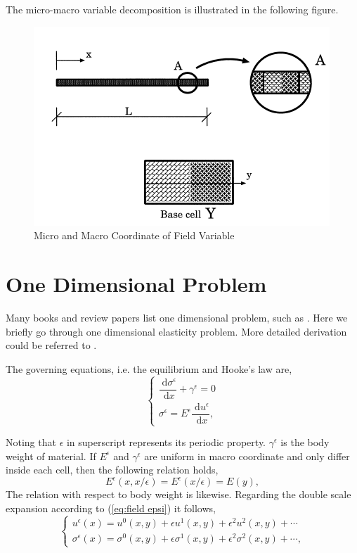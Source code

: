 \documentclass[10pt,a4paper]{scrreprt}
\newcommand{\myd}{\;\mathrm{d}}
\begin{document}
The micro-macro variable decomposition is illustrated in the following figure.

\begin{figure}[h]
  \centering
    \label{fig: scale sepa}
    \includegraphics[width=0.45\linewidth]{../pics/ref_cell_mic_mac_coord.png}
  \caption{Micro and Macro Coordinate of Field Variable \citep{hassani1998review}}
\end{figure}

\section{One Dimensional Problem}
Many books and review papers list one dimensional problem, such as \citep{cioranescu_introduction_2000}. Here we briefly go through one dimensional elasticity problem. More detailed derivation could be referred to \citep{hassani1998review}.

The governing equations, i.e. the equilibrium and Hooke's law are,
\begin{equation}
\left\{
\begin{array}{l}
\dfrac{\myd{\sigma^{\epsilon}}}{\myd{x}} + \gamma^{\epsilon} = 0 \\
\sigma^{\epsilon} = E^{\epsilon} \dfrac{\myd{u^{\epsilon}}}{\myd{x}},
\end{array}
\right.
\end{equation}

Noting that $\epsilon$ in superscript represents its periodic property. $\gamma^{\epsilon}$ is the body weight of material. If $E^{\epsilon}$ and $\gamma^{\epsilon}$ are uniform in macro coordinate and only differ inside each cell, then the following relation holds,
\begin{equation}
E^{\epsilon}(x,x/\epsilon)=E^{\epsilon}(x/\epsilon)=E(y),
\end{equation}
The relation with respect to body weight is likewise. Regarding the double scale expansion according to (\ref{eq:field epsi}) it follows,
\begin{equation}
\label{eq:1st 1d}
\left\{
\begin{array}{l}
u^{\epsilon}(x) = u^{0}(x,y) + \epsilon u^{1}(x,y) + \epsilon^{2} u^{2}(x,y) + \cdots \\
\sigma^{\epsilon}(x) = \sigma^{0}(x,y) + \epsilon \sigma^{1}(x,y) + \epsilon^{2} \sigma^{2}(x,y) + \cdots,
\end{array}
\right.
\end{equation}
\end{document}
